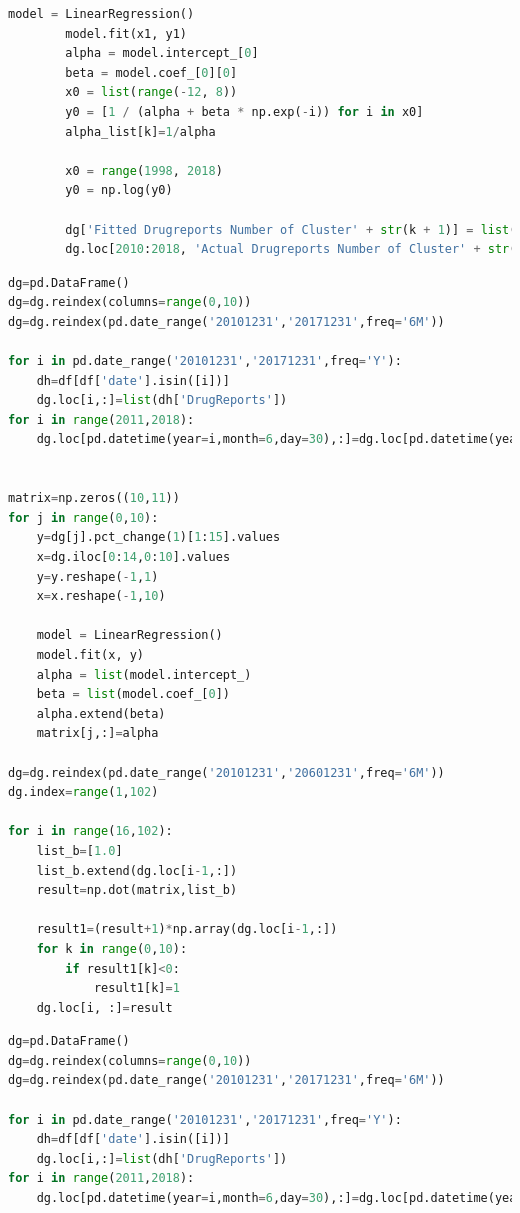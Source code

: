 \documentclass[12pt]{article}
\begin{document}
\begin{appendices}
\begin{lstlisting}[language={python}, caption=\texttt{Logistic Model}]
		model = LinearRegression()
		model.fit(x1, y1)
		alpha = model.intercept_[0]
		beta = model.coef_[0][0]
		x0 = list(range(-12, 8))
		y0 = [1 / (alpha + beta * np.exp(-i)) for i in x0]
		alpha_list[k]=1/alpha

		x0 = range(1998, 2018)
		y0 = np.log(y0)

		dg['Fitted Drugreports Number of Cluster' + str(k + 1)] = list(y0)
		dg.loc[2010:2018, 'Actual Drugreports Number of Cluster' + str(k + 1)] = np.log(y)
\end{lstlisting}

\begin{lstlisting}[language={python}, caption=\texttt{LVM Model}]
dg=pd.DataFrame()
dg=dg.reindex(columns=range(0,10))
dg=dg.reindex(pd.date_range('20101231','20171231',freq='6M'))

for i in pd.date_range('20101231','20171231',freq='Y'):
    dh=df[df['date'].isin([i])]
    dg.loc[i,:]=list(dh['DrugReports'])
for i in range(2011,2018):
    dg.loc[pd.datetime(year=i,month=6,day=30),:]=dg.loc[pd.datetime(year=i-1,month=12,day=31),:]/2+dg.loc[pd.datetime(year=i,month=12,day=31),:]/2


matrix=np.zeros((10,11))
for j in range(0,10):
    y=dg[j].pct_change(1)[1:15].values
    x=dg.iloc[0:14,0:10].values
    y=y.reshape(-1,1)
    x=x.reshape(-1,10)

    model = LinearRegression()
    model.fit(x, y)
    alpha = list(model.intercept_)
    beta = list(model.coef_[0])
    alpha.extend(beta)
    matrix[j,:]=alpha

dg=dg.reindex(pd.date_range('20101231','20601231',freq='6M'))
dg.index=range(1,102)

for i in range(16,102):
    list_b=[1.0]
    list_b.extend(dg.loc[i-1,:])
    result=np.dot(matrix,list_b)

    result1=(result+1)*np.array(dg.loc[i-1,:])
    for k in range(0,10):
        if result1[k]<0:
            result1[k]=1
    dg.loc[i, :]=result
\end{lstlisting}

\begin{lstlisting}[language={python}, caption=\texttt{Modified LVM Model}]
dg=pd.DataFrame()
dg=dg.reindex(columns=range(0,10))
dg=dg.reindex(pd.date_range('20101231','20171231',freq='6M'))

for i in pd.date_range('20101231','20171231',freq='Y'):
    dh=df[df['date'].isin([i])]
    dg.loc[i,:]=list(dh['DrugReports'])
for i in range(2011,2018):
    dg.loc[pd.datetime(year=i,month=6,day=30),:]=dg.loc[pd.datetime(year=i-1,month=12,day=31),:]/2+dg.loc[pd.datetime(year=i,month=12,day=31),:]/2


\end{lstlisting}
\end{appendices}
\end{document}

